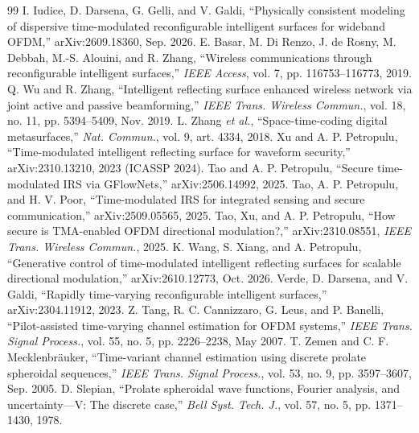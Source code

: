 \begin{thebibliography}{99}
 I. Iudice, D. Darsena, G. Gelli, and V. Galdi, ``Physically consistent modeling of dispersive time-modulated reconfigurable intelligent surfaces for wideband OFDM,'' arXiv:2609.18360, Sep. 2026.
 E. Basar, M. Di Renzo, J. de Rosny, M. Debbah, M.-S. Alouini, and R. Zhang, ``Wireless communications through reconfigurable intelligent surfaces,'' \emph{IEEE Access}, vol. 7, pp. 116753--116773, 2019.
 Q. Wu and R. Zhang, ``Intelligent reflecting surface enhanced wireless network via joint active and passive beamforming,'' \emph{IEEE Trans. Wireless Commun.}, vol. 18, no. 11, pp. 5394--5409, Nov. 2019.
 L. Zhang \emph{et al.}, ``Space-time-coding digital metasurfaces,'' \emph{Nat. Commun.}, vol. 9, art. 4334, 2018.
  Xu and A. P. Petropulu, ``Time-modulated intelligent reflecting surface for waveform security,'' arXiv:2310.13210, 2023 (ICASSP 2024). 
  Tao and A. P. Petropulu, ``Secure time-modulated IRS via GFlowNets,'' arXiv:2506.14992, 2025. 
  Tao, A. P. Petropulu, and H. V. Poor, ``Time-modulated IRS for integrated sensing and secure communication,'' arXiv:2509.05565, 2025. 
  Tao,  Xu, and A. P. Petropulu, ``How secure is TMA-enabled OFDM directional modulation?,'' arXiv:2310.08551, \emph{IEEE Trans. Wireless Commun.}, 2025. 
 K. Wang, S. Xiang, and A. Petropulu, ``Generative control of time-modulated intelligent reflecting surfaces for scalable directional modulation,'' arXiv:2610.12773, Oct. 2026.
  Verde, D. Darsena, and V. Galdi, ``Rapidly time-varying reconfigurable intelligent surfaces,'' arXiv:2304.11912, 2023. 
 Z. Tang, R. C. Cannizzaro, G. Leus, and P. Banelli, ``Pilot-assisted time-varying channel estimation for OFDM systems,'' \emph{IEEE Trans. Signal Process.}, vol. 55, no. 5, pp. 2226--2238, May 2007.
 T. Zemen and C. F. Mecklenbr\"auker, ``Time-variant channel estimation using discrete prolate spheroidal sequences,'' \emph{IEEE Trans. Signal Process.}, vol. 53, no. 9, pp. 3597--3607, Sep. 2005.
 D. Slepian, ``Prolate spheroidal wave functions, Fourier analysis, and uncertainty---V: The discrete case,'' \emph{Bell Syst. Tech. J.}, vol. 57, no. 5, pp. 1371--1430, 1978.

\end{thebibliography}
